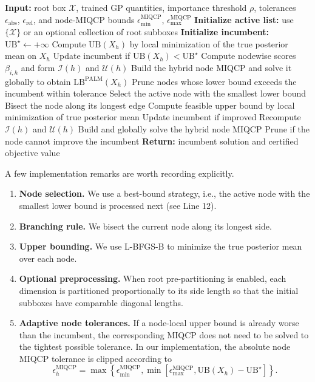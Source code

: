 \documentclass[pdflatex,sn-mathphys-num]{sn-jnl}%
\theoremstyle{thmstyleone}%
\theoremstyle{thmstyletwo}%
\theoremstyle{thmstylethree}%
\begin{document}
\begin{algorithm}[t]
\caption{PALM-Mean}
\label{alg:palm_mean_full}
\begin{algorithmic}[1]
\State \textbf{Input:} root box $\mathcal{X}$, trained GP quantities, importance threshold $\rho$, tolerances $\epsilon_{\mathrm{abs}}$, $\epsilon_{\mathrm{rel}}$, and node-MIQCP bounds $\epsilon_{\min}^{\mathrm{MIQCP}}$, $\epsilon_{\max}^{\mathrm{MIQCP}}$
\State \textbf{Initialize active list:} use $\{\mathcal{X}\}$ or an optional collection of root subboxes
\State \textbf{Initialize incumbent:} $\mathrm{UB}^\star\leftarrow +\infty$
    \State Compute $\mathrm{UB}(X_h)$ by local minimization of the true posterior mean on $X_h$
    \State Update incumbent if $\mathrm{UB}(X_h)<\mathrm{UB}^\star$
    \State Compute nodewise scores $\beta_{i,h}$ and form $\mathcal{I}(h)$ and $\mathcal{U}(h)$
    \State Build the hybrid node MIQCP and solve it globally to obtain $\mathrm{LB}^{\mathrm{PALM}}(X_h)$
\EndFor
\State Prune nodes whose lower bound exceeds the incumbent within tolerance
    \State Select the active node with the smallest lower bound
    \State Bisect the node along its longest edge
        \State Compute feasible upper bound by local minimization of true posterior mean
        \State Update incumbent if improved
        \State Recompute $\mathcal{I}(h)$ and $\mathcal{U}(h)$
        \State Build and globally solve the hybrid node MIQCP
        \State Prune if the node cannot improve the incumbent
    \EndFor
\EndWhile
\State \textbf{Return:} incumbent solution and certified objective value
\end{algorithmic}
\end{algorithm}

A few implementation remarks are worth recording explicitly.
\begin{enumerate}
    \item \textbf{Node selection.} We use a best-bound strategy, i.e., the active node with the smallest lower bound is processed next (see Line 12).
    \item \textbf{Branching rule.} We bisect the current node along its longest side.
    \item \textbf{Upper bounding.} We use L-BFGS-B to minimize the true posterior mean over each node.
    \item \textbf{Optional preprocessing.} When root pre-partitioning is enabled, each dimension is partitioned proportionally to its side length so that the initial subboxes have comparable diagonal lengths.
    \item \textbf{Adaptive node tolerances.} If a node-local upper bound is already worse than the incumbent, the corresponding MIQCP does not need to be solved to the tightest possible tolerance. In our implementation, the absolute node MIQCP tolerance is clipped according to
    \[
    \epsilon_h^{\mathrm{MIQCP}}
    =
    \max\!\left\{
    \epsilon_{\min}^{\mathrm{MIQCP}},
    \min\!\left[
    \epsilon_{\max}^{\mathrm{MIQCP}},
    \mathrm{UB}(X_h)-\mathrm{UB}^\star
    \right]
    \right\}.
    \]
\end{enumerate}
\end{document}
